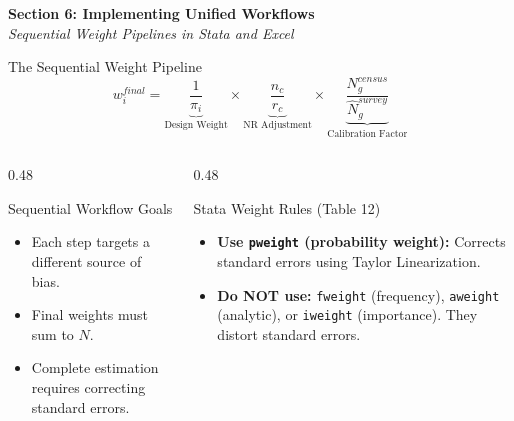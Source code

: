 \documentclass[10pt, aspectratio=169]{beamer}
\begin{document}
{
\begin{frame}[plain, c]
  \centering
  \color{white}
  \Huge \textbf{Section 6: Implementing Unified Workflows} \\
  \vspace{0.4cm}
  \Large \textit{Sequential Weight Pipelines in Stata and Excel}
\end{frame}
}

\begin{frame}{The Sequential Weight Pipeline}
  \begin{equation}
    w_i^{final} = \underbrace{\frac{1}{\pi_i}}_{\text{Design Weight}} \times \underbrace{\frac{n_c}{r_c}}_{\text{NR Adjustment}} \times \underbrace{\frac{N_g^{census}}{\hat{N}_g^{survey}}}_{\text{Calibration Factor}}
  \end{equation}

  \begin{columns}[T]
    \begin{column}{0.48\textwidth}
      \begin{block}{Sequential Workflow Goals}
        \begin{itemize}
          \item Each step targets a different source of bias.
          \item Final weights must sum to $N$.
          \item Complete estimation requires correcting standard errors.
        \end{itemize}
      \end{block}
    \end{column}
    \begin{column}{0.48\textwidth}
      \begin{block}{Stata Weight Rules (Table 12)}
        \begin{itemize}
          \item \textbf{Use \texttt{pweight} (probability weight):} Corrects standard errors using Taylor Linearization.
          \item \textbf{Do NOT use:} \texttt{fweight} (frequency), \texttt{aweight} (analytic), or \texttt{iweight} (importance). They distort standard errors.
        \end{itemize}
      \end{block}
    \end{column}
  \end{columns}
\end{frame}
\end{document}
